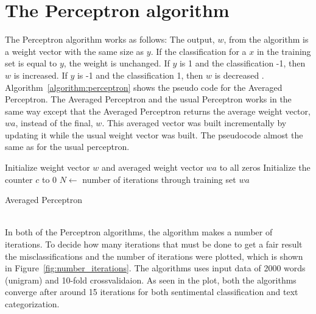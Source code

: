 \section{The Perceptron algorithm}
The Perceptron algorithm works as follows:
The output, $w$, from the algorithm is a weight vector with the same size as $y$. If the classification for a $x$ in the training set is equal to $y$, the weight is unchanged.
If $y$ is 1 and the classification -1, then $w$ is increased. If $y$ is -1 and the classification 1, then $w$ is decreased \citep{perceptron_ai}. Algorithm~\ref{algorithm:perceptron} shows the pseudo code for the Averaged Perceptron. The Averaged Perceptron and the usual Perceptron works in the same way except that the Averaged Perceptron returns the average weight vector, $wa$, instead of the final, $w$.
This averaged vector was built incrementally by updating it while the usual weight vector was built. The pseudocode almost the same as for the usual perceptron.
\begin{algorithm}[h!]
 \SetAlgoLined
 Initialize weight vector $w$ and averaged weight vector $wa$ to all zeros\;
 Initialize the counter $c$ to 0\;
 $N \leftarrow$ number of iterations through training set\;
 \Return $wa$
 \caption{Averaged Perceptron}
 \label{algorithm:perceptron}
\end{algorithm} \\
In both of the Perceptron algorithms, the algorithm makes a number of iterations. To decide how many iterations that must be done to get a fair result the misclassifications and the number of iterations were plotted, which is shown in Figure~\ref{fig:number_iterations}. The algorithms uses input data of 2000 words (unigram) and 10-fold crossvalidaion. As seen in the plot, both the algorithms converge after around 15 iterations for both sentimental classification and text categorization.
